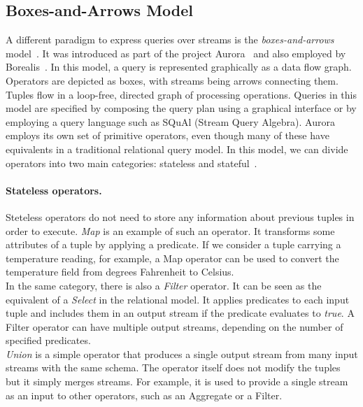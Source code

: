 \clearpage
\subsection*{Boxes-and-Arrows Model}
\label{boxes_and_arrows}
A different paradigm to express queries over streams is the
\emph{boxes-and-arrows} model~\cite{boxes-and-arrows}.
It was introduced as part of the project Aurora~\cite{aurora-and-medusa} and also employed by
Borealis~\cite{borealis-design}.
In this model, a query is represented graphically as a data flow graph. Operators are depicted as boxes,
with streams being arrows connecting them. Tuples flow in a loop-free, directed graph of processing
operations. Queries in this model are specified by composing the query plan using a graphical interface
or by employing a query language such as SQuAl (Stream Query Algebra).
Aurora employs its own set of primitive operators, even though many of these have equivalents in a
traditional relational query model.
In this model, we can divide operators into two main categories: stateless and
stateful~\cite{borealis-app-manual}.

\paragraph{Stateless operators.} Steteless operators do not need to store any information about previous
tuples in order to execute.
\emph{Map} is an example of such an operator. It transforms some attributes of a tuple by applying a
predicate. If we consider a tuple carrying a temperature reading, for example, a Map operator can be
used to convert the temperature field from degrees Fahrenheit to Celsius.\\
In the same category, there is also a \emph{Filter} operator. It can be seen as the equivalent of a
\emph{Select} in the relational model.
It applies predicates to each input tuple and includes them in an output stream if the predicate evaluates to \emph{true}.
A Filter operator can have multiple output streams, depending on the number of specified predicates. \\
\emph{Union} is a simple operator that produces a single output stream from many input streams with the
same schema. The operator itself does not modify the tuples but it simply merges
streams. For example, it is used to provide a single stream as an input to other
operators, such as an Aggregate or a Filter.


